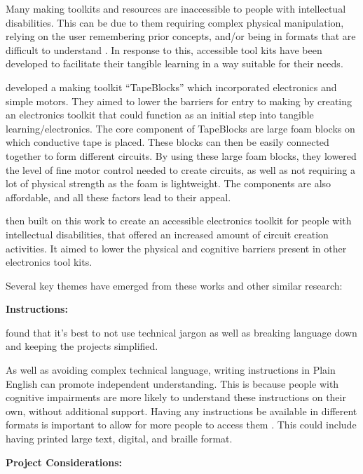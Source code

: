 \documentclass{l4proj}
\begin{document}
Many making toolkits and resources are inaccessible to people with intellectual disabilities. This can be due to them requiring complex physical manipulation, relying on the user remembering prior concepts, and/or being in formats that are difficult to understand \citep{Lef2016}. In response to this, accessible tool kits have been developed to facilitate their tangible learning in a way suitable for their needs. 

\cite{Ell2021} developed a making toolkit “TapeBlocks” which incorporated electronics and simple motors. They aimed to lower the barriers for entry to making by creating an electronics toolkit that could function as an initial step into tangible learning/electronics. The core component of TapeBlocks are large foam blocks on which conductive tape is placed. These blocks can then be easily connected together to form different circuits. 
By using these large foam blocks, they lowered the level of fine motor control needed to create circuits, as well as not requiring a lot of physical strength as the foam is lightweight. The components are also affordable, and all these factors lead to their appeal.  

\cite{Sen2022} then built on this work to create an accessible electronics toolkit for people with intellectual disabilities, that offered an increased amount of circuit creation activities. It aimed to lower the physical and cognitive barriers present in other electronics tool kits.

Several key themes have emerged from these works and other similar research: 

\textbf{Instructions:} 

\cite{Boc2022} found that it’s best to not use technical jargon as well as breaking language down and keeping the projects simplified. 

As well as avoiding complex technical language, writing instructions in Plain English can promote independent understanding.  This is because people with cognitive impairments are more likely to understand these instructions on their own, without additional support. 
Having any instructions be available in different formats is important to allow for more people to access them \citep{Bra2014}. This could include having printed large text, digital, and braille format. 

\textbf{Project Considerations:} 
\end{document}
